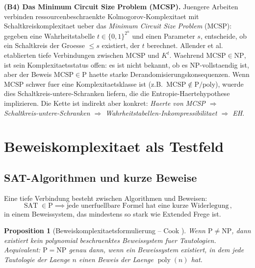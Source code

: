 \documentclass[aps,prd,twocolumn,superscriptaddress,nofootinbib]{revtex4-2}
\newtheorem{proposition}[theorem]{Proposition}
\theoremstyle{definition}
\theoremstyle{remark}
\DeclareMathOperator{\poly}{poly}
\DeclareMathOperator{\SAT}{SAT}
\newcommand{\NP}{\mathrm{NP}}
\newcommand{\PP}{\mathrm{P}}
\begin{document}
\textbf{(B4) Das Minimum Circuit Size Problem (MCSP).} Juengere Arbeiten verbinden ressourcenbeschraenkte Kolmogorov-Komplexitaet mit Schaltkreiskomplexitaet ueber das \textit{Minimum Circuit Size Problem} ($\mathrm{MCSP}$): gegeben eine Wahrheitstabelle $t \in \{0,1\}^{2^n}$ und einen Parameter $s$, entscheide, ob ein Schaltkreis der Groesse $\leq s$ existiert, der $t$ berechnet. Allender et al.~\cite{Allender2006} etablierten tiefe Verbindungen zwischen $\mathrm{MCSP}$ und $K^t$. Waehrend $\mathrm{MCSP} \in \NP$, ist sein Komplexitaetsstatus offen: es ist nicht bekannt, ob es $\NP$-vollstaendig ist, aber der Beweis $\mathrm{MCSP} \in \PP$ haette starke Derandomisierungskonsequenzen. Wenn $\mathrm{MCSP}$ schwer fuer eine Komplexitaetsklasse ist (z.B.\ $\mathrm{MCSP} \notin \PP/\mathrm{poly}$), wuerde dies Schaltkreis-untere-Schranken liefern, die die Entropie-Haertehypothese implizieren. Die Kette ist indirekt aber konkret: \textit{Haerte von MCSP $\Rightarrow$ Schaltkreis-untere-Schranken $\Rightarrow$ Wahrheitstabellen-Inkompressibilitaet $\Rightarrow$ EH}.


\section{Beweiskomplexitaet als Testfeld}
\label{sec:proof_complexity}

\subsection{SAT-Algorithmen und kurze Beweise}

Eine tiefe Verbindung besteht zwischen Algorithmen und Beweisen:
\begin{equation}
\SAT \in \PP \implies \text{jede unerfuellbare Formel hat eine kurze Widerlegung}\,,
\end{equation}
in einem Beweissystem, das mindestens so stark wie Extended Frege ist.

\begin{proposition}[Beweiskomplexitaetsformulierung -- Cook {\cite{Cook1975}}]
\label{prop:proof_complexity}
Wenn $\PP \neq \NP$, dann existiert kein polynomial beschraenktes Beweissystem fuer Tautologien. Aequivalent: $\PP = \NP$ genau dann, wenn ein Beweissystem existiert, in dem jede Tautologie der Laenge $n$ einen Beweis der Laenge $\poly(n)$ hat.
\end{proposition}
\end{document}
